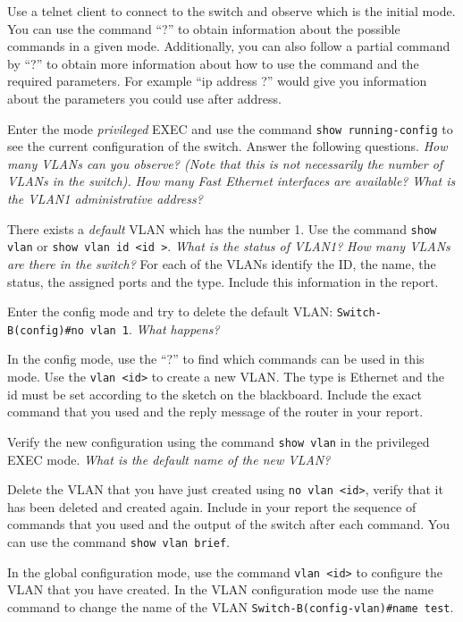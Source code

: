 Use a telnet client to connect to the switch and observe which is the initial mode.
You can use the command ``?'' to obtain information about the possible commands in a given mode.
Additionally, you can also follow a partial command by ``?'' to obtain more information about how to use the command and the required parameters.
For example ``ip address ?'' would give you information about the parameters you could use after address.

Enter the mode \emph{privileged} EXEC and use the command \texttt{show running-config} to see the current configuration of the switch.
Answer the following questions.
\emph{How many VLANs can you observe? (Note that this is not necessarily the number of VLANs in the switch).}
\emph{How many Fast Ethernet interfaces are available?}
\emph{What is the VLAN1 administrative address?}

There exists a \emph{default} VLAN which has the number 1.
Use the command \texttt{show vlan} or \texttt{show vlan id \textless id \textgreater}.
\emph{What is the status of VLAN1?}
\emph{How many VLANs are there in the switch?}
For each of the VLANs identify the ID, the name, the status, the assigned ports and the type.
Include this information in the report.

Enter the config mode and try to delete the default VLAN:
\texttt{Switch-B(config)\#no vlan 1}.
\emph{What happens?}

In the config mode, use the ``?'' to find which commands can be used in this mode.
Use the \texttt{vlan <id>} to create a new VLAN.
The type is Ethernet and the id must be set according to the sketch on the blackboard.
Include the exact command that you used and the reply message of the router in your report.

Verify the new configuration using the command \texttt{show vlan} in the privileged EXEC mode.
\emph{What is the default name of the new VLAN?}

Delete the VLAN that you have just created using \texttt{no vlan <id>}, verify that it has been deleted and created again.
Include in your report the sequence of commands that you used and the output of the switch after each command.
You can use the command \texttt{show vlan brief}.

In the global configuration mode, use the command \texttt{vlan <id>} to configure the VLAN that you have created.
In the VLAN configuration mode use the name command to change the name of the VLAN \texttt{Switch-B(config-vlan)\#name test}.

